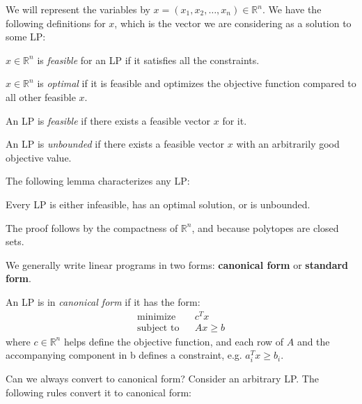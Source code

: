 \documentclass{article}
\newcommand{\reals}{\ensuremath{\mathbb{R}}}
\begin{document}
We will represent the variables by $x = (x_1, x_2, \dots, x_n) \in
\reals^n$.  We have the following definitions for $x$, which  is the
vector we are considering as a solution to some LP:

\begin{definition}
  $x \in \reals^n$ is \emph{feasible} for an LP if it satisfies all
  the constraints.
\end{definition}

\begin{definition}
  $x \in \reals^n$ is \emph{optimal} if it is feasible and optimizes
  the objective function compared to all other feasible $x$.
\end{definition}

\begin{definition}
  An LP is \emph{feasible} if there exists a feasible vector $x$ for
  it.
\end{definition}

\begin{definition}
  An LP is \emph{unbounded} if there exists a feasible vector $x$ with
  an arbitrarily good objective value.
\end{definition}

The following lemma characterizes any LP:

\begin{lemma}
  Every LP is either infeasible, has an optimal solution, or is unbounded.
\end{lemma}

The proof follows by the compactness of $\reals^n$, and because
polytopes are closed sets.

We generally write linear programs in two forms: \textbf{canonical
  form} or \textbf{standard form}.

\begin{definition}
  An LP is in \emph{canonical form} if it has the form:
  \begin{eqnarray*}
    \textrm{minimize } & & c^T x\\
    \textrm{subject to} & & Ax \geq b
  \end{eqnarray*}
  where $c \in \reals^n$ helps define the objective function, and each row of
  $A$ and the accompanying component in b defines a constraint, e.g. $a_i^T x \geq b_i$.
\end{definition}

Can we always convert to canonical form?  Consider an arbitrary LP.  
The following rules convert it to canonical form:
\end{document}
